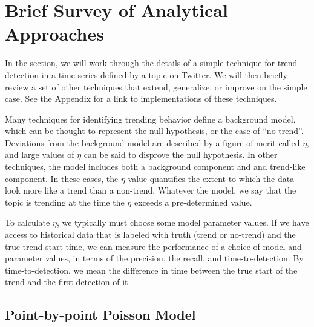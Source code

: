 \documentclass{article}
\begin{document}
\section{Brief Survey of Analytical Approaches}
\label{techniques}

In the section, we will work through the details of a simple technique for
trend detection in a time series defined by a topic on Twitter. We will then briefly
review a set of other techniques that extend, generalize, or improve on the
simple case. See the Appendix for a link to implementations of these
techniques.

Many techniques for identifying trending behavior define a background model,
which can be thought to represent the null hypothesis, or the case of “no
trend”. Deviations from the background model are described by a figure-of-merit
called $\eta$,
and large values of $\eta$ can be said to disprove the null hypothesis. 
In other techniques, the model includes both a background component and
and trend-like component. In these cases, the $\eta$ value quantifies the 
extent to which the data look more like a trend than a non-trend. 
Whatever the model, we say that the topic is trending at the time the
$\eta$ exceeds a pre-determined value. 

To calculate $\eta$, we typically must choose some model parameter values. 
If we have access to historical data that is labeled with truth 
(trend or no-trend) and the true trend start time, we
can measure the performance of a choice of model and parameter values, in terms
of the precision, the recall, and time-to-detection. 
By time-to-detection, we mean the difference in time between the true start of
the trend and the first detection of it. 

\subsection{Point-by-point Poisson Model}
\label{pbppm}
\end{document}
